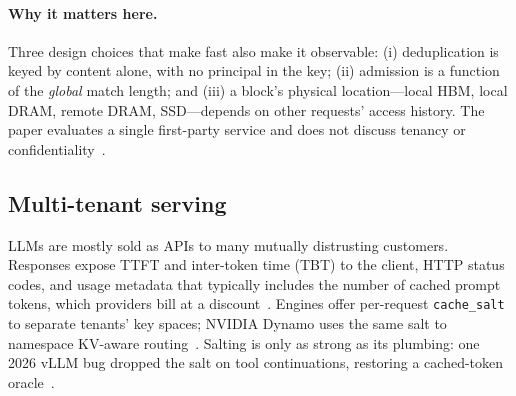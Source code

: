 \paragraph{Why it matters here.} Three design choices that make \mc fast also
make it observable: (i) deduplication is keyed by content alone, with no
principal in the key; (ii) admission is a function of the \emph{global} match
length; and (iii) a block's physical location---local HBM, local DRAM, remote
DRAM, SSD---depends on other requests' access history. The paper evaluates a
single first-party service and does not discuss tenancy or
confidentiality~\cite{qin2025mooncake}.

\subsection{Multi-tenant serving}
LLMs are mostly sold as APIs to many mutually distrusting customers. Responses
expose TTFT and inter-token time (TBT) to the client, HTTP status codes, and
usage metadata that typically includes the number of cached prompt tokens,
which providers bill at a discount~. Engines offer
per-request \texttt{cache\_salt} to separate tenants' key spaces; NVIDIA Dynamo
uses the same salt to namespace KV-aware routing~\cite{vllmcachesalt,dynamonvext}.
Salting is only as strong as its plumbing: one 2026 vLLM bug dropped the salt on
tool continuations, restoring a cached-token oracle~\cite{cve2026105752}.
